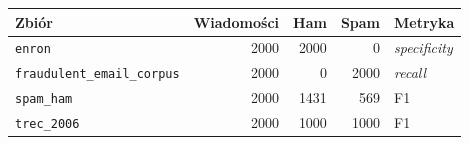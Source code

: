 \begin{tabular}{lrrrl}
\hline
\textbf{Zbiór} & \textbf{Wiadomości} & \textbf{Ham} & \textbf{Spam} & \textbf{Metryka} \\
\hline
\texttt{enron} & 2000 & 2000 & 0 & \emph{specificity} \\
\texttt{fraudulent\_email\_corpus} & 2000 & 0 & 2000 & \emph{recall} \\
\texttt{spam\_ham} & 2000 & 1431 & 569 & F1 \\
\texttt{trec\_2006} & 2000 & 1000 & 1000 & F1 \\
\hline
\end{tabular}
